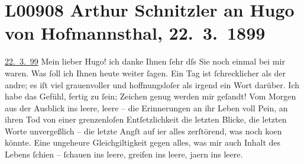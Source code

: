 

\section[Arthur Schnitzler an Hugo von Hofmannsthal, 22. 3. 1899]{L00908 Arthur Schnitzler an Hugo von Hofmannsthal, 22. 3. 1899}
\nopagebreak{}
\rehead{ }\normalsize\beginnumbering{}
\toendnotes[C]{\smallbreak\pagebreak[2]}
\toendnotes[C]{\smallbreak}
\pstart
           \raggedleft{}{\pb}\uline{22. 3. 99}\pend
           \vspace{0.5em}
\pstart
           Mein lieber Hugo! ich danke Ihnen ſehr dſs Sie noch einmal bei mir
               waren. Was ſoll ich Ihnen heute weiter ſagen. Ein Tag ist ſchrecklicher als der
               andre; es iſt viel grauenvoller und hoffnungsloſer als irgend ein Wort darüber. Ich
               habe das Gefühl, fertig zu ſein; Zeichen genug werden mir geſandt! Vom Morgen aus der
               Ausblick ins leere, {\pb}leere – die Erinnerungen an ihr Leben voll Pein, an ihren
               Tod von einer grenzenloſen Entſetzlichkeit{\dotstwo} die letzten
               Blicke, die letzten Worte unvergeßlich – die letzte Angſt auf i{\geminationm}er alles zerſtörend, was noch ko{\geminationm}en könnte. Eine ungeheure Gleichgiltigkeit gegen alles,
               was mir auch Inhalt des Lebens ſchien – ſchauen ins leere, {\pb}greifen ins leere, ja{\geminationm}ern ins leere.\pend
           
